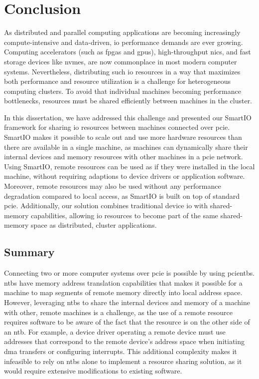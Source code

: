 \chapter{Conclusion}\label{chapter:conclusion}
As distributed and parallel computing applications are becoming increasingly compute-intensive and data-driven, \gls{io} performance demands are ever growing.
%
Computing accelerators (such as \glspl{fpga} and \glspl{gpu}), high-throughput \glspl{nic}, and fast storage devices like \glspl{nvme}, are now commonplace in most modern computer systems.
%
Nevertheless, distributing such \gls{io} resources in a way that maximizes both performance and resource utilization is a challenge for heterogeneous computing clusters. 
%
To avoid that individual machines becoming performance bottlenecks, resources must be shared efficiently between machines in the cluster.



In this dissertation, we have addressed this challenge and presented our SmartIO framework for sharing \gls{io} resources between machines connected over \gls{pcie}.
%
SmartIO makes it possible to scale out and use more hardware resources than there are available in a single machine, as machines can dynamically share their internal devices and memory resources with other machines in a \gls{pcie} network. 
%
Using SmartIO, remote resources can be used as if they were installed in the local machine, without requiring adaptions to device drivers or application software.
%
Moreover, remote resources may also be used without any performance degradation compared to local access, as SmartIO is built on top of standard \gls{pcie}.
%
Additionally, our solution combines traditional device \gls{io} with shared-memory capabilities, allowing \gls{io} resources to become part of the same shared-memory space as distributed, cluster applications.




\section{Summary}
Connecting two or more computer systems over \gls{pcie} is possible by using \glspl{pcientb}.
%
\Glspl{ntb} have memory address translation capabilities that makes it possible for a machine to map \glspl{segment} of remote memory directly into local address space.
%
However, leveraging \glspl{ntb} to share the internal devices and memory of a machine with other, remote machines is a challenge, as the use of a remote resource requires software to be aware of the fact that the resource is on the other side of an \gls{ntb}.
%
For example, a device driver operating a remote device must use addresses that correspond to the remote device's address space when initiating \gls{dma} transfers or configuring interrupts.
%
This additional complexity makes it infeasible to rely on \glspl{ntb} alone to implement a resource sharing solution, as it would require extensive modifications to existing software.



